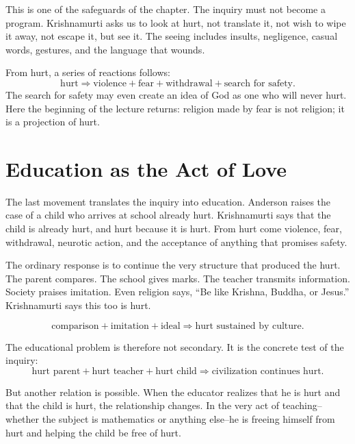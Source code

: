 This is one of the safeguards of the chapter. The inquiry must not become a program. Krishnamurti asks us to look at hurt, not translate it, not wish to wipe it away, not escape it, but see it. The seeing includes insults, negligence, casual words, gestures, and the language that wounds.

From hurt, a series of reactions follows:
\begin{equation}
\text{hurt}
\Rightarrow
\text{violence}+\text{fear}+\text{withdrawal}+\text{search for safety}.
\end{equation}
The search for safety may even create an idea of God as one who will never hurt. Here the beginning of the lecture returns: religion made by fear is not religion; it is a projection of hurt.

\section{Education as the Act of Love}

The last movement translates the inquiry into education. Anderson raises the case of a child who arrives at school already hurt. Krishnamurti says that the child is already hurt, and hurt because it is hurt. From hurt come violence, fear, withdrawal, neurotic action, and the acceptance of anything that promises safety.

The ordinary response is to continue the very structure that produced the hurt. The parent compares. The school gives marks. The teacher transmits information. Society praises imitation. Even religion says, ``Be like Krishna, Buddha, or Jesus.'' Krishnamurti says this too is hurt.

\begin{equation}
\text{comparison}+\text{imitation}+\text{ideal}
\Rightarrow
\text{hurt sustained by culture}.
\end{equation}

The educational problem is therefore not secondary. It is the concrete test of the inquiry:
\begin{equation}
\text{hurt parent}+\text{hurt teacher}+\text{hurt child}
\Rightarrow
\text{civilization continues hurt}.
\end{equation}

But another relation is possible. When the educator realizes that he is hurt and that the child is hurt, the relationship changes. In the very act of teaching--whether the subject is mathematics or anything else--he is freeing himself from hurt and helping the child be free of hurt.

